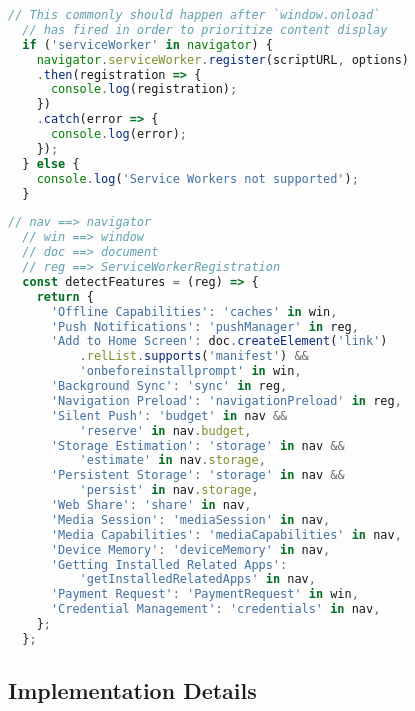\documentclass[sigconf,hyphens]{acmart}
\begin{document}
\begin{lstlisting}[caption={Checking for Service Worker support.},
  label=code:sw-supported, language=JavaScript, float=t] 
  // This commonly should happen after `window.onload`
  // has fired in order to prioritize content display
  if ('serviceWorker' in navigator) { 
    navigator.serviceWorker.register(scriptURL, options)
    .then(registration => {
      console.log(registration);
    })
    .catch(error => {
      console.log(error);
    });
  } else {
    console.log('Service Workers not supported');
  }
\end{lstlisting}

\begin{lstlisting}[caption={Feature detection of various \textsc{pwa} features.},
  label=code:feature-detection, language=JavaScript, float=t] 
  // nav ==> navigator
  // win ==> window
  // doc ==> document
  // reg ==> ServiceWorkerRegistration
  const detectFeatures = (reg) => {
    return {
      'Offline Capabilities': 'caches' in win,
      'Push Notifications': 'pushManager' in reg,
      'Add to Home Screen': doc.createElement('link')
          .relList.supports('manifest') &&
          'onbeforeinstallprompt' in win,
      'Background Sync': 'sync' in reg,
      'Navigation Preload': 'navigationPreload' in reg,
      'Silent Push': 'budget' in nav &&
          'reserve' in nav.budget,
      'Storage Estimation': 'storage' in nav &&
          'estimate' in nav.storage,
      'Persistent Storage': 'storage' in nav &&
          'persist' in nav.storage,
      'Web Share': 'share' in nav,
      'Media Session': 'mediaSession' in nav,
      'Media Capabilities': 'mediaCapabilities' in nav,
      'Device Memory': 'deviceMemory' in nav,
      'Getting Installed Related Apps':
          'getInstalledRelatedApps' in nav,
      'Payment Request': 'PaymentRequest' in win,
      'Credential Management': 'credentials' in nav,
    };
  };    
\end{lstlisting}  

\subsection{Implementation Details}
\end{document}
